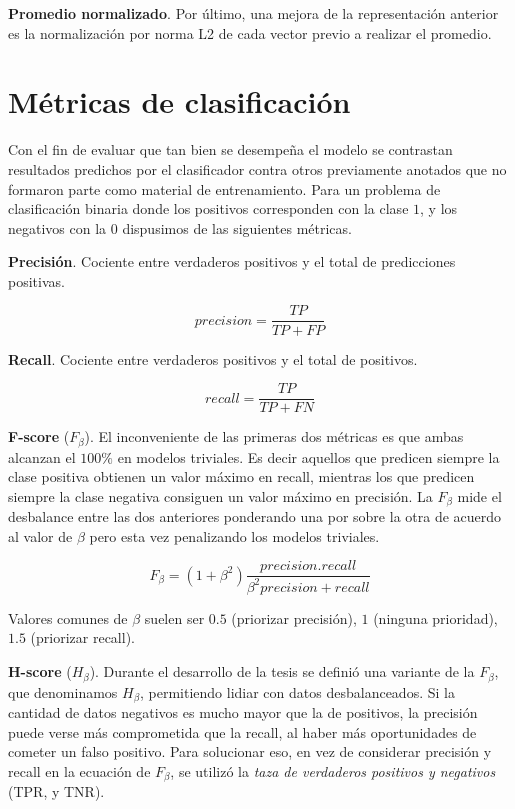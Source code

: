 \textbf{Promedio normalizado}. Por último, una mejora de la representación
anterior es la normalización por norma L2 de cada vector previo a realizar el
promedio.

\section{Métricas de clasificación}

Con el fin de evaluar que tan bien se desempeña el modelo se contrastan
resultados predichos por el clasificador contra otros previamente anotados que
no formaron parte como material de entrenamiento. Para un problema de
clasificación binaria donde los positivos corresponden con la clase $1$, y los
negativos con la $0$ dispusimos de las siguientes métricas.

\textbf{Precisión}. Cociente entre verdaderos positivos y el total de
predicciones positivas. 

\begin{equation}
    precision = \frac{TP}{TP + FP}
\end{equation}

\textbf{Recall}. Cociente entre verdaderos positivos y el total de positivos.

\begin{equation}
    recall = \frac{TP}{TP + FN}
\end{equation}

\textbf{F-score} ($F_{\beta}$). El inconveniente de las primeras dos métricas es
que ambas alcanzan el $100\%$ en modelos triviales. Es decir aquellos que predicen
siempre la clase positiva obtienen un valor máximo en recall, mientras los que
predicen siempre la clase negativa consiguen un valor máximo en precisión. La
$F_{\beta}$ mide el desbalance entre las dos anteriores ponderando una por sobre
la otra de acuerdo al valor de $\beta$ pero esta vez penalizando los modelos
triviales. 

\begin{equation}
    F_{\beta} = (1 + \beta^2) \frac{precision . recall}{\beta^2 precision + recall}
\end{equation}

Valores comunes de $\beta$ suelen ser $0.5$ (priorizar precisión), $1$ (ninguna
prioridad), $1.5$ (priorizar recall).

\textbf{H-score} ($H_{\beta}$). Durante el desarrollo de la tesis se definió una
variante de la $F_{\beta}$, que denominamos $H_{\beta}$, permitiendo lidiar con
datos desbalanceados. Si la cantidad de datos negativos es mucho mayor que la de
positivos, la precisión puede verse más comprometida que la recall, al haber más
oportunidades de cometer un falso positivo. Para solucionar eso, en vez de
considerar precisión y recall en la ecuación de $F_{\beta}$, se utilizó la
\emph{taza de verdaderos positivos y negativos} (TPR, y TNR).


